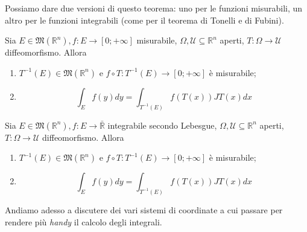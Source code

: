 %
Possiamo dare due versioni di questo teorema: uno per le funzioni misurabili, un altro per le funzioni integrabili (come per il teorema di Tonelli e di Fubini).
%
\vspace{0.5cm}
\begin{theorem}[\textcolor{blue}{cambio di variabili per funzioni misurabili}]
	Sia $E \in \mathfrak{M}(\mathbb{R}^n), f: E \to [0; +\infty]$ misurabile, $\Omega, \mathcal{U} \subseteq \mathbb{R}^n$ aperti, $T: \Omega \to \mathcal{U}$ diffeomorfismo. Allora
	\begin{enumerate}[label=\protect\circled{\arabic*}]
		\item $T^{-1}(E) \in \mathfrak{M}(\mathbb{R}^n)$ e $f \circ T: T^{-1}(E) \to [0; +\infty]$ è misurabile;
		\item $$\int_E f(y)dy = \int_{T^{-1}(E)} f(T(x))JT(x)dx$$
	\end{enumerate}
\end{theorem}
%
\vspace{0.5cm}
\begin{theorem}[\textcolor{blue}{cambio di variabili per funzioni integrabili}]
	Sia $E \in \mathfrak{M}(\mathbb{R}^n), f: E \to \bar{\mathbb{R}}$ integrabile secondo Lebesgue, $\Omega, \mathcal{U} \subseteq \mathbb{R}^n$ aperti, $T: \Omega \to \mathcal{U}$ diffeomorfismo. Allora
	\begin{enumerate}[label=\protect\circled{\arabic*}]
		\item $T^{-1}(E) \in \mathfrak{M}(\mathbb{R}^n)$ e $f \circ T: T^{-1}(E) \to [0; +\infty]$ è misurabile;
		\item $$\int_E f(y)dy = \int_{T^{-1}(E)} f(T(x))JT(x)dx$$
	\end{enumerate}
\end{theorem}
%
Andiamo adesso a discutere dei vari sistemi di coordinate a cui passare per rendere più \emph{handy} il calcolo degli integrali.
%
\vspace{0.5cm}
